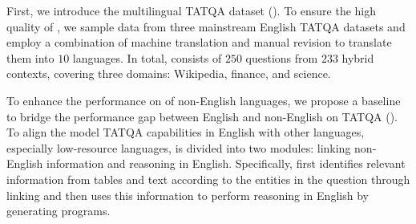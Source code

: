 First, we introduce the multilingual TATQA dataset (\ourdataset).
To ensure the high quality of \ourdataset, we sample data from three mainstream English TATQA datasets and employ a combination of machine translation and manual revision to translate them into $10$ languages.
In total, \ourdataset consists of $250$ questions from $233$ hybrid contexts, covering three domains: Wikipedia, finance, and science. 

To enhance the performance on \ourdataset of non-English languages, we propose a baseline to bridge the performance gap between English and non-English on TATQA (\ourmethod). 
To align the model TATQA capabilities in English with other languages, especially low-resource languages, \ourmethod is divided into two modules: linking non-English information and reasoning in English. 
Specifically, \ourmethod first identifies relevant information from tables and text according to the entities in the question through linking and then uses this information to perform reasoning in English by generating programs.


